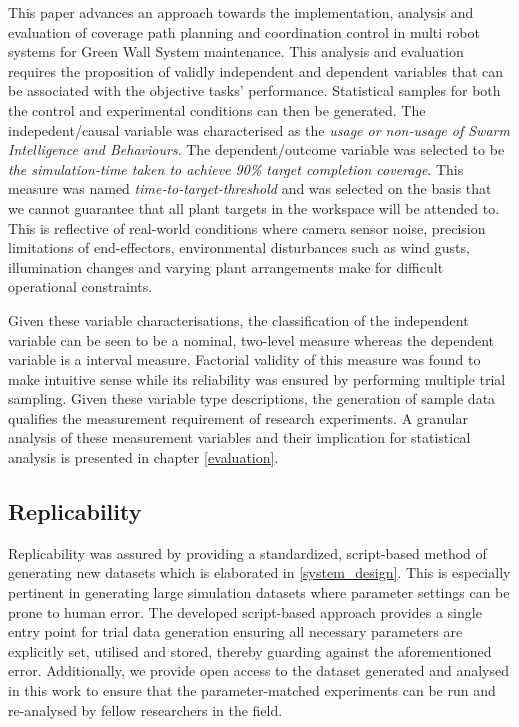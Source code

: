 \documentclass{report}
\begin{document}
This paper advances an approach towards the implementation, analysis and evaluation of coverage path planning and coordination control in multi robot systems for Green Wall System maintenance. This analysis and evaluation requires the proposition of validly independent and dependent variables that can be associated with the objective tasks' performance. Statistical samples for both the control and experimental conditions can then be generated. The indepedent/causal variable was characterised as the \textit{usage or non-usage of Swarm Intelligence and Behaviours}. The dependent/outcome variable was selected to be \textit{the simulation-time taken to achieve 90\% target completion coverage}. This measure was named \textit{time-to-target-threshold} and was selected on the basis that we cannot guarantee that all plant targets in the workspace will be attended to. This is reflective of real-world conditions where camera sensor noise, precision limitations of end-effectors, environmental disturbances such as wind gusts, illumination changes and varying plant arrangements make for difficult operational constraints.

Given these variable characterisations, the classification of the independent variable can be seen to be a nominal, two-level measure whereas the dependent variable is a interval measure. Factorial validity of this measure was found to make intuitive sense \cite{Field2012} while its reliability was ensured by performing multiple trial sampling. Given these variable type descriptions, the generation of sample data qualifies the measurement requirement of research experiments. A granular analysis of these measurement variables and their implication for statistical analysis is presented in chapter \ref{evaluation}.

\subsection{Replicability}

Replicability was assured by providing a standardized, script-based method of generating new datasets which is elaborated in \ref{system_design}. This is especially pertinent in generating large simulation datasets where parameter settings can be prone to human error. The developed script-based approach provides a single entry point for trial data generation ensuring all necessary parameters are explicitly set, utilised and stored, thereby guarding against the aforementioned error. Additionally, we provide open access to the dataset generated and analysed in this work to ensure that the parameter-matched experiments can be run and re-analysed by fellow researchers in the field.
\end{document}
